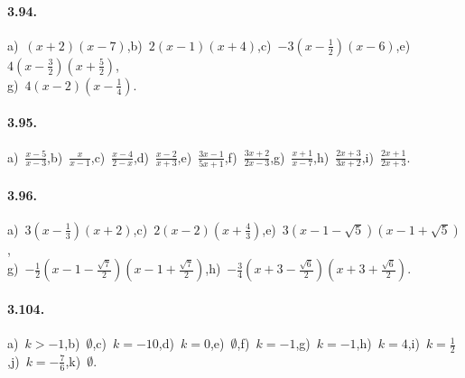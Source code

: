 \paragraph{3.94.} a)~$(x + 2) (x-7)$,\quad b)~$2 (x-1) (x + 4)$,\quad c)~$- 3 \left(x-\frac{1}{2} \right) (x-6)$,\quad e)~$4 \left(x-\frac{3}{2} \right) \left(x + \frac{5}{2} \right)$,\protect\\
g)~$4 (x-2) \left(x-\frac{1}{4} \right)$.

\paragraph{3.95.} a)~$\frac{x-5}{x-3}$,\quad b)~$\frac{x}{x-1}$,\quad c)~$\frac{x-4}{2-x}$,\quad d)~$\frac{x-2}{x+3}$,\quad e)~$\frac{3x-1}{5x+1}$,\quad f)~$\frac{3x+2}{2x-3}$,\quad g)~$\frac{x+1}{x-7}$,\quad h)~$\frac{2x+3}{3x+2}$,\quad i)~$\frac{2x+1}{2x+3}$. %


\paragraph{3.96.} a)~$3 \left(x-\frac{1}{3} \right) (x + 2)$,\quad c)~$2 (x-2) \left(x + \frac{4}{3} \right)$,\quad e)~$3 \left(x-1-\sqrt{5} \right) \left(x-1 + \sqrt{5} \right)$,\protect\\
g)~$- \frac{1}{2} \left(x-1-\frac{\sqrt{7}}{2} \right) \left(x- 1 + \frac{\sqrt{7}}{2} \right)$,\quad h)~$- \frac{3}{4} \left(x + 3-\frac{\sqrt{6}}{2} \right) \left(x+ 3 + \frac{\sqrt{6}}{2} \right)$.


\paragraph{3.104.} a)~$k >-1$,\quad b)~$\emptyset$,\quad c)~$k =-10$,\quad d)~$k = 0$,\quad e)~$ \emptyset $,\quad f)~$ k =-1 $,\quad g)~$ k =-1 $,\quad h)~$ k = 4 $,\quad i)~$ k = \frac{1}{2} $,\quad j)~$ k =-\frac{7}{6} $,\quad k)~$\emptyset$.

